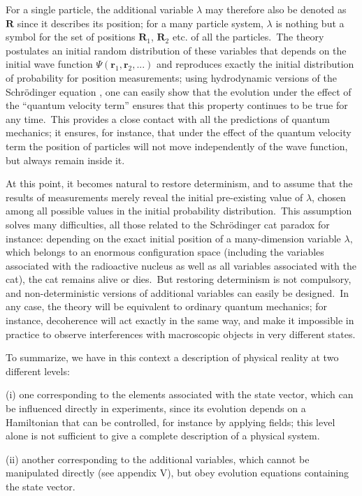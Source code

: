 \documentclass[12pt,onecolumn]{article}%
\begin{document}
For a single particle, the additional variable $\lambda$ may therefore also be
denoted as $\mathbf{R}$ since it describes its position; for a many particle
system, $\lambda$ is nothing but a symbol for the set of positions
$\mathbf{R}_{1}$, $\mathbf{R}_{2}$ etc. of all the particles.\ The theory
postulates an initial random distribution of these variables that depends on
the initial wave function $\Psi(\mathbf{r}_{1},\mathbf{r}_{2},...)$ and
reproduces exactly the initial distribution of probability for position
measurements; using hydrodynamic versions of the Schr\"{o}dinger equation
\cite{Madelung}, one can easily show that the evolution under the effect of
the ``quantum velocity term'' ensures that this property continues to be true
for any time.\ This provides a close contact with all the predictions of
quantum mechanics; it ensures, for instance, that under the effect of the
quantum velocity term the position of particles will not move independently of
the wave function, but always remain inside it.

At this point, it becomes natural to restore determinism, and to assume that
the results of measurements merely reveal the initial pre-existing value of
$\lambda$, chosen among all possible values in the initial probability
distribution.\ This assumption solves many difficulties, all those related to
the Schr\"{o}dinger cat paradox for instance: depending on the exact initial
position of a many-dimension variable $\lambda,$ which belongs to an enormous
configuration space (including the variables associated with the radioactive
nucleus as well as all variables associated with the cat), the cat remains
alive or dies.\ But restoring determinism is not compulsory, and
non-deterministic versions of additional variables can easily be designed.\ In
any case, the theory will be equivalent to ordinary quantum mechanics; for
instance, decoherence will act exactly in the same way, and make it impossible
in practice to observe interferences with macroscopic objects in very
different states.

To summarize, we have in this context a description of physical reality at two
different levels:

(i) one corresponding to the elements associated with the state vector, which
can be influenced directly in experiments, since its evolution depends on a
Hamiltonian that can be controlled, for instance by applying fields; this
level alone is not sufficient to give a complete description of a physical system.

(ii) another corresponding to the additional variables, which cannot be
manipulated directly (see appendix V), but obey evolution equations containing
the state vector.
\end{document}
